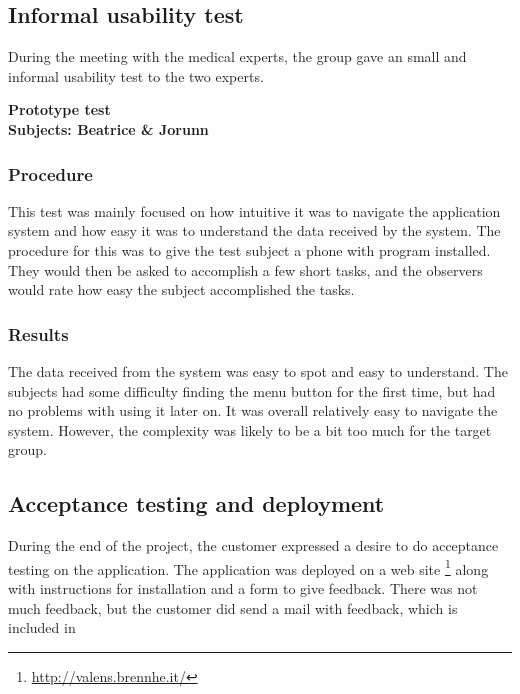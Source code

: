 \subsection{Informal usability test}
During the meeting with the medical experts, the group gave an small and informal usability test to the two experts. 

\textbf{Prototype test}\\
\textbf{Subjects: Beatrice \& Jorunn}
\\

\subsubsection{Procedure}
This test was mainly focused on how intuitive it was to navigate the application system and how easy it was to understand the data received by the system. The procedure for this was to give the test subject a phone with program installed. They would then be asked to accomplish a few short tasks, and the observers would rate how easy the subject accomplished the tasks. 

\subsubsection{Results}
The data received from the system was easy to spot and easy to understand. The subjects had some difficulty finding the menu button for the first time, but had no problems with using it later on. It was overall relatively easy to navigate the system. However, the complexity was likely to be a bit too much for the target group.

\subsection{Acceptance testing and deployment}
During the end of the project, the customer expressed a desire to do acceptance testing on the application. The application was deployed on a web site \footnote{\url{http://valens.brennhe.it/}} along with instructions for installation and a form to give feedback. There was not much feedback, but the customer did send a mail with feedback, which is included in \pageref{appendix:testResults}
